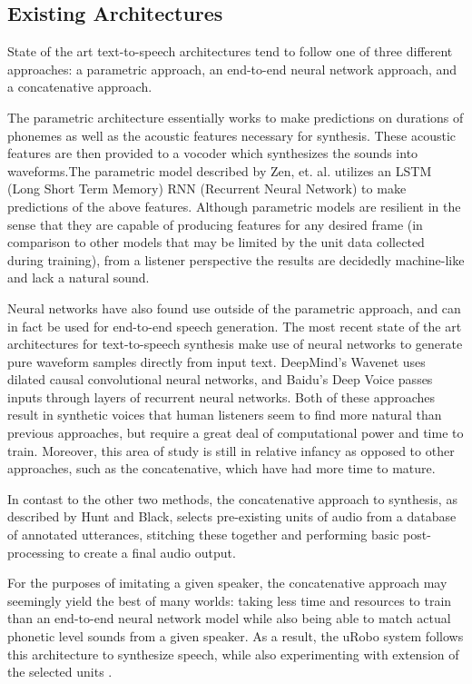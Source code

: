 \documentclass[10pt, journal, compsoc]{IEEEtran}
\begin{document}
\subsection{Existing Architectures}
State of the art text-to-speech architectures tend to follow one of three different approaches: a parametric approach, an end-to-end neural network approach, and a concatenative approach.\par
The parametric architecture essentially works to make predictions on durations of phonemes as well as the acoustic features necessary for synthesis. These acoustic features are then provided to a vocoder which synthesizes the sounds into waveforms.The parametric model described by Zen, et. al. utilizes an LSTM (Long Short Term Memory) RNN (Recurrent Neural Network) to make predictions of the above features.\cite{DBLP:journals/corr/ZenAEHS16} Although parametric models are resilient in the sense that they are capable of producing features for any desired frame (in comparison to other models that may be limited by the unit data collected during training), from a listener perspective the results are decidedly machine-like and lack a natural sound.\par
Neural networks have also found use outside of the parametric approach, and can in fact be used for end-to-end speech generation. The most recent state of the art architectures for text-to-speech synthesis make use of neural networks to generate pure waveform samples directly from input text. DeepMind's Wavenet uses dilated causal convolutional neural networks\cite{DBLP:journals/corr/ArikCCDGKLMRSS17}, and Baidu's Deep Voice passes inputs through layers of recurrent neural networks. Both of these approaches result in synthetic voices that human listeners seem to find more natural than previous approaches\cite{DBLP:journals/corr/OordDZSVGKSK16}, but require a great deal of computational power and time to train. Moreover, this area of study is still in relative infancy as opposed to other approaches, such as the concatenative, which have had more time to mature.\par
In contast to the other two methods, the concatenative approach to synthesis, as described by Hunt and Black, selects pre-existing units of audio from a database of annotated utterances, stitching these together and performing basic post-processing to create a final audio output\cite{Hunt:1996:USC:1256383.1256532}. \par
For the purposes of imitating a given speaker, the concatenative approach may seemingly yield the best of many worlds: taking less time and resources to train than an end-to-end neural network model while also being able to match actual phonetic level sounds from a given speaker. As a result, the uRobo system follows this architecture to synthesize speech, while also experimenting with extension of the selected units .  
\end{document}
